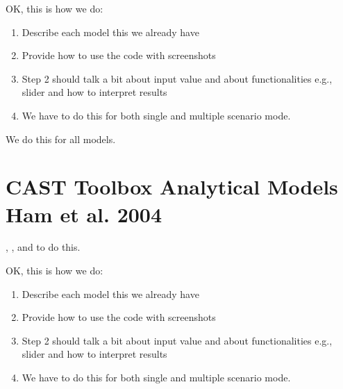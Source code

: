 \documentclass[letterpaper,10pt,english]{sphinxmanual}
\begin{document}
\sphinxAtStartPar
OK, this is how we do:
\begin{enumerate}
%
\item {} 
\sphinxAtStartPar
Describe each model \sphinxhyphen{} this we already have

\item {} 
\sphinxAtStartPar
Provide how to use the code with screenshots

\item {} 
\sphinxAtStartPar
Step 2 should talk a bit about input value and about functionalities \sphinxhyphen{} e.g., slider and how to interpret results

\item {} 
\sphinxAtStartPar
We have to do this for both single and multiple scenario mode.

\end{enumerate}

\sphinxAtStartPar
We do this for all models.


\section{CAST Toolbox \sphinxhyphen{} Analytical Models \sphinxhyphen{} Ham et al. 2004}
\label{\detokenize{contents/toolbox/an_model/ham2004:cast-toolbox-analytical-models-ham-et-al-2004}}\label{\detokenize{contents/toolbox/an_model/ham2004::doc}}
\sphinxAtStartPar
{}, ,  and  to do this.

\sphinxAtStartPar
OK, this is how we do:
\begin{enumerate}
%
\item {} 
\sphinxAtStartPar
Describe each model \sphinxhyphen{} this we already have

\item {} 
\sphinxAtStartPar
Provide how to use the code with screenshots

\item {} 
\sphinxAtStartPar
Step 2 should talk a bit about input value and about functionalities \sphinxhyphen{} e.g., slider and how to interpret results

\item {} 
\sphinxAtStartPar
We have to do this for both single and multiple scenario mode.

\end{enumerate}
\end{document}
